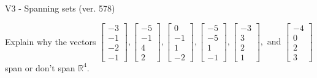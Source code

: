\begin{exercise}
  \begin{exerciseTitle}V3 - Spanning sets (ver. 578)\end{exerciseTitle}
  \begin{exerciseStatement}
    Explain why the vectors \(\left[\begin{array}{r}
-3 \\
-1 \\
-2 \\
-1
\end{array}\right] , \left[\begin{array}{r}
-5 \\
-1 \\
4 \\
2
\end{array}\right] , \left[\begin{array}{r}
0 \\
-1 \\
1 \\
-2
\end{array}\right] , \left[\begin{array}{r}
-5 \\
-5 \\
1 \\
-1
\end{array}\right] , \left[\begin{array}{r}
-3 \\
3 \\
2 \\
1
\end{array}\right] , \text{ and } \left[\begin{array}{r}
-4 \\
0 \\
2 \\
3
\end{array}\right]\) span or don't span \(\mathbb{R}^4\). 
	



\end{exerciseStatement}
\end{exercise}
